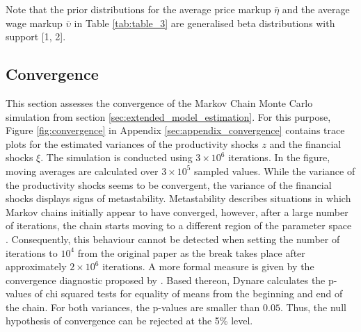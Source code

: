 Note that the prior distributions for the average price markup $\bar{\eta}$ and the average wage markup $\bar{\upsilon}$ in Table \ref{tab:table_3} are generalised beta distributions with support [1, 2].


\subsection{Convergence}
\label{sec:convergence}

This section assesses the convergence of the Markov Chain Monte Carlo simulation from section \ref{sec:extended_model_estimation}. For this purpose, Figure \ref{fig:convergence} in Appendix \ref{sec:appendix_convergence} contains trace plots for the estimated variances of the productivity shocks $z$ and the financial shocks $\xi$. The simulation is conducted using $3\times10^{6}$ iterations. In the figure, moving averages are calculated over $3\times10^{5}$ sampled values. While the variance of the productivity shocks seems to be convergent, the variance of the financial shocks displays signs of metastability. Metastability describes situations in which Markov chains initially appear to have converged, however, after a large number of iterations, the chain starts moving to a different region of the parameter space \citep{PATILpymc}. Consequently, this behaviour cannot be detected when setting the number of iterations to $10^{4}$ from the original paper as the break takes place after approximately $2\times10^{6}$ iterations. A more formal measure is given by the convergence diagnostic proposed by \cite{GEWEKEevaluating}. Based thereon, Dynare calculates the p-values of chi squared tests for equality of means from the beginning and end of the chain. For both variances, the p-values are smaller than $0.05$. Thus, the null hypothesis of convergence can be rejected at the 5\% level.
